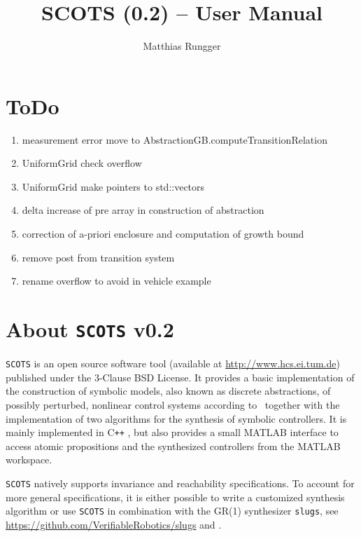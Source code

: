 \documentclass[a4paper]{amsart}
\title{SCOTS (0.2) -- User Manual}
\author{Matthias Rungger}
\newcommand\Cpp{C\texttt{++} }
\begin{document}
  \maketitle

	\tableofcontents
	\newpage
	

\section{ToDo}

\begin{enumerate}
  \item measurement error move to AbstractionGB.computeTransitionRelation 
  \item UniformGrid check overflow
  \item UniformGrid make pointers to std::vectors
  \item delta increase of pre array in construction of abstraction
  \item correction of a-priori enclosure and computation of growth bound
	\item remove post from transition system
	\item rename overflow to avoid in vehicle example
\end{enumerate}

\newpage


\section{About {\tt SCOTS} v0.2}

{\tt SCOTS} is an open source software tool (available at
\mbox{\url{http://www.hcs.ei.tum.de}}) published under the 3-Clause BSD License. It
provides a basic implementation of the construction of symbolic models, also
known as discrete abstractions, of possibly perturbed, nonlinear control systems
according to~\cite{ReissigWeberRungger15} together with the implementation of
two algorithms for the synthesis of symbolic controllers. It is mainly implemented
in \Cpp, but also provides a small MATLAB interface to access atomic propositions
and the synthesized controllers from the MATLAB workspace.

{\tt SCOTS} natively supports invariance and reachability
specifications. To account for more general specifications, it is either
possible to write a customized synthesis algorithm or use {\tt SCOTS} in
combination with the GR(1) synthesizer {\tt slugs}, see 
\url{https://github.com/VerifiableRobotics/slugs} and \cite{EhlersRaman16}.
\end{document}
